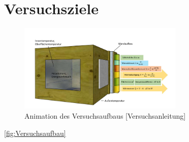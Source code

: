 \section{Versuchsziele}
\begin{figure}[!h]
		\centering
		\includegraphics[width=0.7\textwidth]{Abbildungen/Thurow_Deckblatt}
		\caption{Animation des Versuchsaufbaus [Versuchsanleitung] }
		\label{fig:Versuchsaufbau}
\end{figure}

\autoref{fig:Versuchsaufbau}